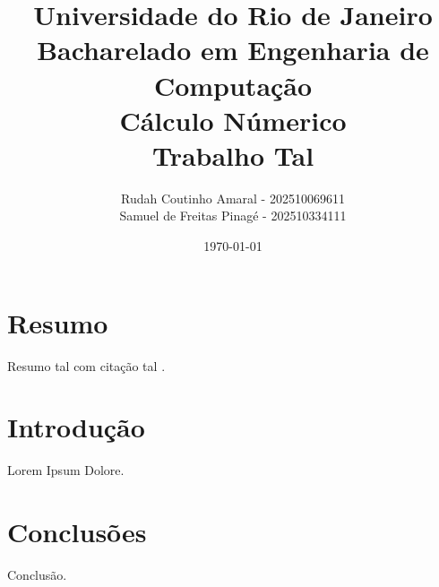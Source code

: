 \documentclass{article}
\title{
    Universidade do Rio de Janeiro\\
    Bacharelado em Engenharia de Computação\\
    Cálculo Númerico\\
    Trabalho Tal
}
\author{
    Rudah Coutinho Amaral - 202510069611\\
    Samuel de Freitas Pinagé - 202510334111
}
\date{\today}
\begin{document}
\maketitle

\section*{Resumo}

Resumo tal com citação tal \cite{gomesruggiero1997}.

\clearpage
\tableofcontents

\clearpage
\section{Introdução}

Lorem Ipsum Dolore.

\clearpage
\section{Conclusões}

Conclusão.

\clearpage

\end{document}
